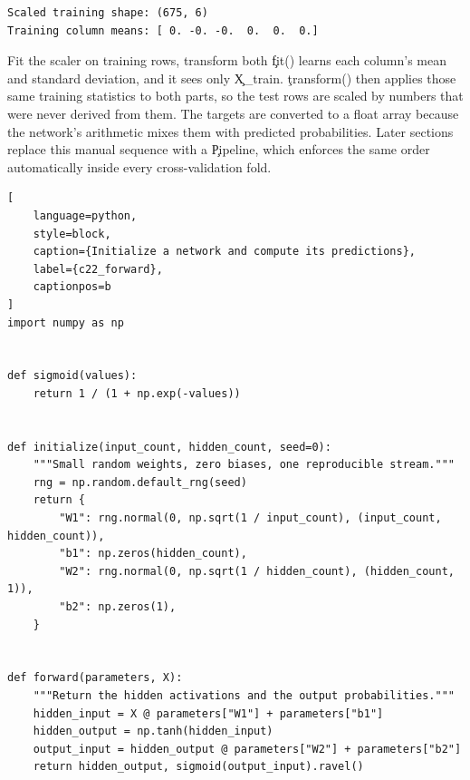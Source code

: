 \begin{lstlisting}[language=text, style=block, caption={Every feature now has mean zero and unit variance}, label={c22_data_output}, captionpos=b]
Scaled training shape: (675, 6)
Training column means: [ 0. -0. -0.  0.  0.  0.]
\end{lstlisting}

\begin{SyntaxBox}{Fit the scaler on training rows, transform both}
\c{fit()} learns each column's mean and standard deviation, and it sees only
\c{X_train}. \c{transform()} then applies those same training statistics to both
parts, so the test rows are scaled by numbers that were never derived from them.
The targets are converted to a float array because the network's arithmetic mixes
them with predicted probabilities. Later sections replace this manual sequence
with a \c{Pipeline}, which enforces the same order automatically inside every
cross-validation fold.
\end{SyntaxBox}


\begin{lstlisting}[
    language=python,
    style=block,
    caption={Initialize a network and compute its predictions},
    label={c22_forward},
    captionpos=b
]
import numpy as np


def sigmoid(values):
    return 1 / (1 + np.exp(-values))


def initialize(input_count, hidden_count, seed=0):
    """Small random weights, zero biases, one reproducible stream."""
    rng = np.random.default_rng(seed)
    return {
        "W1": rng.normal(0, np.sqrt(1 / input_count), (input_count, hidden_count)),
        "b1": np.zeros(hidden_count),
        "W2": rng.normal(0, np.sqrt(1 / hidden_count), (hidden_count, 1)),
        "b2": np.zeros(1),
    }


def forward(parameters, X):
    """Return the hidden activations and the output probabilities."""
    hidden_input = X @ parameters["W1"] + parameters["b1"]
    hidden_output = np.tanh(hidden_input)
    output_input = hidden_output @ parameters["W2"] + parameters["b2"]
    return hidden_output, sigmoid(output_input).ravel()
\end{lstlisting}


